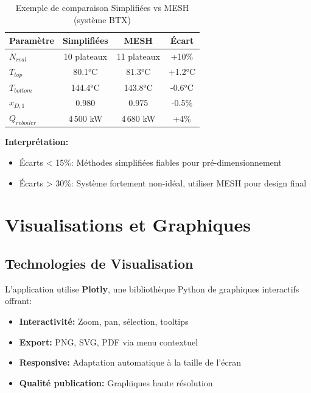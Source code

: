\documentclass[11pt,a4paper]{article}
\begin{document}
\begin{table}[h]
\centering
\small
\begin{tabular}{lccc}
\toprule
\textbf{Paramètre} & \textbf{Simplifiées} & \textbf{MESH} & \textbf{Écart} \\
\midrule
$N_{real}$ & 10 plateaux & 11 plateaux & +10\% \\
$T_{top}$ & 80.1°C & 81.3°C & +1.2°C \\
$T_{bottom}$ & 144.4°C & 143.8°C & -0.6°C \\
$x_{D,1}$ & 0.980 & 0.975 & -0.5\% \\
$Q_{reboiler}$ & 4\,500 kW & 4\,680 kW & +4\% \\
\bottomrule
\end{tabular}
\caption{Exemple de comparaison Simplifiées vs MESH (système BTX)}
\end{table}

\textbf{Interprétation:}
\begin{itemize}[leftmargin=*]
    \item Écarts < 15\%: Méthodes simplifiées fiables pour pré-dimensionnement
    \item Écarts > 30\%: Système fortement non-idéal, utiliser MESH pour design final
\end{itemize}

\section{Visualisations et Graphiques}

\subsection{Technologies de Visualisation}

L'application utilise \textbf{Plotly}, une bibliothèque Python de graphiques interactifs offrant:

\begin{itemize}[leftmargin=*]
    \item \textbf{Interactivité:} Zoom, pan, sélection, tooltips
    \item \textbf{Export:} PNG, SVG, PDF via menu contextuel
    \item \textbf{Responsive:} Adaptation automatique à la taille de l'écran
    \item \textbf{Qualité publication:} Graphiques haute résolution
\end{itemize}
\end{document}

